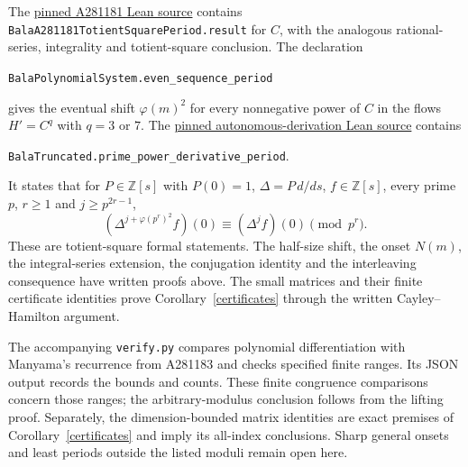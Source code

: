 \documentclass[11pt]{article}
\begin{document}
The \href{https://github.com/the-omega-institute/trureturing/blob/92de86888730265f84e24d28bdb67546c543a966/D5/S1/Recurrence/Periodic/BalaA281181TotientSquarePeriod.lean}{pinned A281181 Lean source}
contains \texttt{BalaA281181TotientSquarePeriod.result} for $C$,
with the analogous rational-series, integrality and totient-square conclusion.
The declaration
\begin{center}\small\texttt{BalaPolynomialSystem.even\_sequence\_period}\end{center}
gives
the eventual shift $\varphi(m)^2$ for every nonnegative power of $C$
in the flows $H'=C^q$ with $q=3$ or $7$.
The \href{https://github.com/the-omega-institute/trureturing/blob/92de86888730265f84e24d28bdb67546c543a966/D5/S1/Recurrence/Periodic/AutonomousDerivationTotientSquarePeriod.lean}{pinned autonomous-derivation Lean source}
contains
\begin{center}\small\texttt{BalaTruncated.prime\_power\_derivative\_period}.\end{center}
It states that
for $P\in\mathbb Z[s]$ with $P(0)=1$, $\Delta=P\,d/ds$,
$f\in\mathbb Z[s]$, every prime $p$, $r\ge1$ and $j\ge p^{2r-1}$,
\[
 (\Delta^{j+\varphi(p^r)^2}f)(0)
 \equiv(\Delta^jf)(0)\pmod{p^r}.
\]
These are totient-square formal statements. The half-size shift,
the onset $N(m)$, the integral-series extension, the conjugation identity
and the interleaving consequence have written proofs above.
The small matrices and their finite certificate identities prove
Corollary~\ref{certificates} through the written Cayley--Hamilton argument.

The accompanying \texttt{verify.py} compares polynomial differentiation
with Manyama's recurrence from A281183 and checks specified finite
ranges. Its JSON output records the bounds and counts. These finite
congruence comparisons concern those ranges; the arbitrary-modulus conclusion
follows from the lifting proof. Separately, the dimension-bounded matrix
identities are exact premises of Corollary~\ref{certificates} and imply its
all-index conclusions. Sharp general onsets and least periods outside
the listed moduli remain open here.
\end{document}
